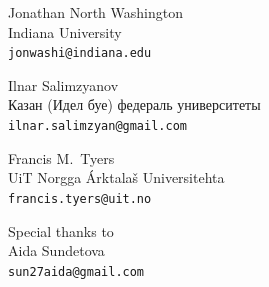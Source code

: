 \documentclass[a0paper,fontscale=0.3]{baposter}  %
\begin{document}
\begin{poster}
{			\vspace{-0.5em}
			\begin{center}
			{\begin{minipage}[t]{11.2em}
				\begin{spacing}{0.4}
					{Jonathan North Washington}\\
					{\footnotesize Indiana University\\\texttt{jonwashi@indiana.edu}}
				\end{spacing}
			\end{minipage}
			\begin{minipage}[t]{10.5em}
				\begin{spacing}{0.4}
					{Ilnar Salimzyanov}\\
					{\footnotesize Казан (Идел буе) федераль университеты \\\texttt{ilnar.salimzyan@gmail.com}}
				\end{spacing}
			\end{minipage}
			\begin{minipage}[t]{8.2em}
				\begin{spacing}{0.4}
					{Francis M.\ Tyers}\\
					{\footnotesize UiT Norgga Árktalaš Universitehta \\\texttt{francis.tyers@uit.no}}
				\end{spacing}
			\end{minipage}}
			\begin{minipage}[t]{5.5em}
				\begin{spacing}{0.4}
					{\footnotesize Special thanks to}\\
					{\small Aida Sundetova}\\
					{\footnotesize \texttt{sun27aida@gmail.com}}
				\end{spacing}
			\end{minipage}
			\end{center}

}
\end{poster}
\end{document}
